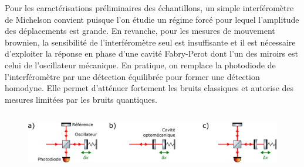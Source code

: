 \documentclass[12pt,a4paper]{article}
\begin{document}
Pour les caractérisations préliminaires des échantillons, un simple interféromètre de Michelson convient puisque l'on étudie un régime forcé pour lequel l'amplitude des déplacements est grande.
En revanche, pour les mesures de mouvement brownien, la sensibilité de l'interféromètre seul est insuffisante et il est nécessaire d'exploiter la réponse en phase d'une cavité Fabry-Perot dont l'un des miroirs est celui de l'oscillateur mécanique.
En pratique, on remplace la photodiode de l'interféromètre par une détection équilibrée pour former une détection homodyne.
Elle permet d'atténuer fortement les bruits classiques et autorise des mesures limitées par les bruits quantiques. 

\begin{figure}
\center
\includegraphics[height=75pt]{figures/detection_scheme.png}


\end{figure}
\end{document}
